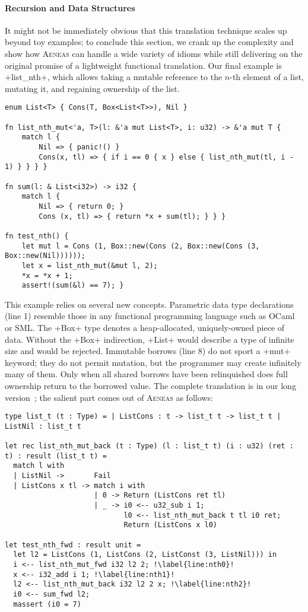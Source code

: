 \documentclass[acmsmall,screen]{acmart}
\newif\ifshort
\newcommand{\aeneas}{\textsc{Aeneas}\xspace}
\newcommand\myparagraph[1]{\emph{#1}.\ }
\let\myparagraph\paragraph
\begin{document}
\myparagraph{Recursion and Data Structures}
It might not be immediately obvious that this translation technique scales up
beyond toy examples; to conclude this section, we crank up the complexity and
show how \aeneas can handle a wide variety of idioms while still delivering on the
original promise of a lightweight functional translation.
Our final example is
 \li+list_nth+, which allows taking a mutable reference to the $n$-th
element of a list, mutating it, and regaining ownership of the list.
\begin{verbatim}
enum List<T> { Cons(T, Box<List<T>>), Nil }

fn list_nth_mut<'a, T>(l: &'a mut List<T>, i: u32) -> &'a mut T {
    match l {
        Nil => { panic!() }
        Cons(x, tl) => { if i == 0 { x } else { list_nth_mut(tl, i - 1) } } } }

fn sum(l: & List<i32>) -> i32 {
    match l {
        Nil => { return 0; }
        Cons (x, tl) => { return *x + sum(tl); } } }

fn test_nth() {
    let mut l = Cons (1, Box::new(Cons (2, Box::new(Cons (3, Box::new(Nil))))));
    let x = list_nth_mut(&mut l, 2);
    *x = *x + 1;
    assert!(sum(&l) == 7); }
\end{verbatim}
This example relies on several new concepts. Parametric data type declarations
(line 1) resemble those in any functional programming language such as OCaml
or SML. The \li+Box+ type denotes a heap-allocated, uniquely-owned piece of
data. Without the \li+Box+ indirection, \li+List+ would describe a type of
infinite size and would be rejected. Immutable borrows (line 8) do not sport a
\li+mut+ keyword; they do not permit mutation, but the programmer may create
infinitely many of them. Only when all shared borrows have been relinquished
does full ownership return to the borrowed value.
\ifshort
The complete translation is in our long version~\cite{longversion}; the salient part comes
out of \aeneas as follows:
\begin{verbatim}
type list_t (t : Type) = | ListCons : t -> list_t t -> list_t t | ListNil : list_t t

let rec list_nth_mut_back (t : Type) (l : list_t t) (i : u32) (ret : t) : result (list_t t) =
  match l with
  | ListNil ->       Fail
  | ListCons x tl -> match i with
                     | 0 -> Return (ListCons ret tl)
                     | _ -> i0 <-- u32_sub i 1;
                            l0 <-- list_nth_mut_back t tl i0 ret;
                            Return (ListCons x l0)

let test_nth_fwd : result unit =
  let l2 = ListCons (1, ListCons (2, ListConst (3, ListNil))) in
  i <-- list_nth_mut_fwd i32 l2 2; !\label{line:nth0}!
  x <-- i32_add i 1; !\label{line:nth1}!
  l2 <-- list_nth_mut_back i32 l2 2 x; !\label{line:nth2}!
  i0 <-- sum_fwd l2;
  massert (i0 = 7)
\end{verbatim}
\end{document}
